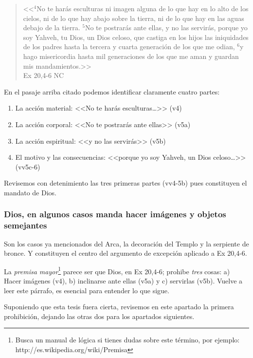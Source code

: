 \documentclass{article}
\begin{document}
\begin{quote}
<<$^4$No te har\'as esculturas ni imagen alguna de lo que hay en lo alto de los cielos, ni de lo que hay abajo sobre la tierra, ni de lo que hay en las aguas debajo de la tierra. $^5$No te postrar\'as ante ellas, y no las servir\'as, porque yo soy Yahveh, tu Dios, un Dios celoso, que castiga en los hijos las iniquidades de los padres hasta la tercera y cuarta generaci\'on de los que me odian, $^6$y hago misericordia hasta mil generaciones de los que me aman y guardan mis mandamientos.>>\\ 
Ex 20,4-6 NC
\end{quote}

\noindent
En el pasaje arriba citado podemos identificar claramente cuatro partes:

\begin{enumerate}
\item La acci\'on material: <<No te har\'as esculturas\ldots>> (v4)
\item La acci\'on corporal: <<No te postrar\'as ante ellas>> (v5a)
\item La acci\'on espiritual: <<y no las servir\'as>> (v5b)
\item El motivo y las consecuencias: <<porque yo soy Yahveh, un Dios celoso\ldots>> (vv5c-6)
\end{enumerate}

\noindent
Revisemos con detenimiento las tres primeras partes (vv4-5b) pues constituyen el mandato de Dios.

\subsubsection{Dios, en algunos casos manda hacer im\'agenes y objetos semejantes}

Son los casos ya mencionados del Arca, la decoraci\'on del Templo y la serpiente de bronce. Y constituyen el centro del argumento de excepci\'on aplicado a Ex 20,4-6.

La \emph{premisa mayor}\footnote{Busca un manual de l\'ogica si tienes dudas sobre este t\'ermino, por ejemplo: http://es.wikipedia.org/wiki/Premisa} parece ser que Dios, en Ex 20,4-6; prohibe \emph{tres} cosas: a) Hacer im\'agenes (v4), b) inclinarse ante ellas (v5a) y c) servirlas (v5b). Vuelve a leer este p\'arrafo, es esencial para entender lo que sigue.

Suponiendo que esta tesis fuera cierta, revisemos en este apartado la primera prohibici\'on, dejando las otras dos para los apartados siguientes.
\end{document}
